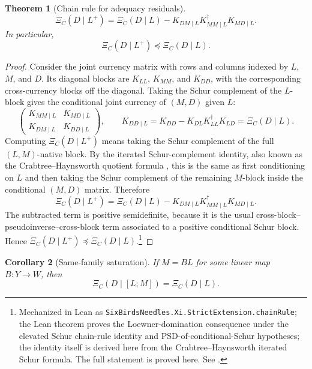 \documentclass[11pt]{article}
\newcommand{\preceqq}{\preceq}
\newtheorem{theorem}{Theorem}[section]
\newtheorem{corollary}[theorem]{Corollary}
\theoremstyle{definition}
\begin{document}
\begin{theorem}[Chain rule for adequacy residuals]\label{thm:xi:chain-rule}
\[
  \boxed{
  \Xi_C(D\mid L^+)
  =
  \Xi_C(D\mid L)
  -
  K_{DM\mid L}K_{MM\mid L}^\dagger K_{MD\mid L}.}
\]
In particular,
\[
  \Xi_C(D\mid L^+)\preceqq \Xi_C(D\mid L).
\]
\end{theorem}

\begin{proof}
Consider the joint currency matrix with rows and columns indexed by \(L\),
\(M\), and \(D\).  Its diagonal blocks are \(K_{LL}\), \(K_{MM}\), and
\(K_{DD}\), with the corresponding cross-currency blocks off the diagonal.
Taking the Schur complement of the \(L\)-block gives the conditional joint
currency of \((M,D)\) given \(L\):
\[
  \begin{pmatrix}
    K_{MM\mid L} & K_{MD\mid L}\\
    K_{DM\mid L} & K_{DD\mid L}
  \end{pmatrix},
  \qquad
  K_{DD\mid L}
  =
  K_{DD}-K_{DL}K_{LL}^\dagger K_{LD}
  =
  \Xi_C(D\mid L).
\]
Computing \(\Xi_C(D\mid L^+)\) means taking the Schur complement of the full
\((L,M)\)-native block.  By the iterated Schur-complement identity, also known
as the Crabtree--Haynsworth quotient formula
\citep{CrabtreeHaynsworth1969Quotient,Ando2005SchurOperator}, this is the same
as first
conditioning on \(L\) and then taking the Schur complement of the remaining
\(M\)-block inside the conditional \((M,D)\) matrix.  Therefore
\[
  \Xi_C(D\mid L^+)
  =
  \Xi_C(D\mid L)
  -
  K_{DM\mid L}K_{MM\mid L}^\dagger K_{MD\mid L}.
\]
The subtracted term is positive semidefinite, because it is the usual
cross-block--pseudoinverse--cross-block term associated to a positive
conditional Schur block.  Hence
\(\Xi_C(D\mid L^+)\preceqq \Xi_C(D\mid L)\).\footnote{Mechanized in Lean as \texttt{SixBirdsNeedles.Xi.StrictExtension.chainRule}; the Lean theorem proves the Loewner-domination consequence under the elevated Schur chain-rule identity and PSD-of-conditional-Schur hypotheses; the identity itself is derived here from the Crabtree--Haynsworth iterated Schur formula.  The full statement is proved here.  See .}
\end{proof}

\begin{corollary}[Same-family saturation]\label{cor:xi:same-family-saturation}
If \(M=BL\) for some linear map \(B\colon Y\to W\), then
\[
  \Xi_C(D\mid [L;M])=\Xi_C(D\mid L).
\]
\end{corollary}
\end{document}
